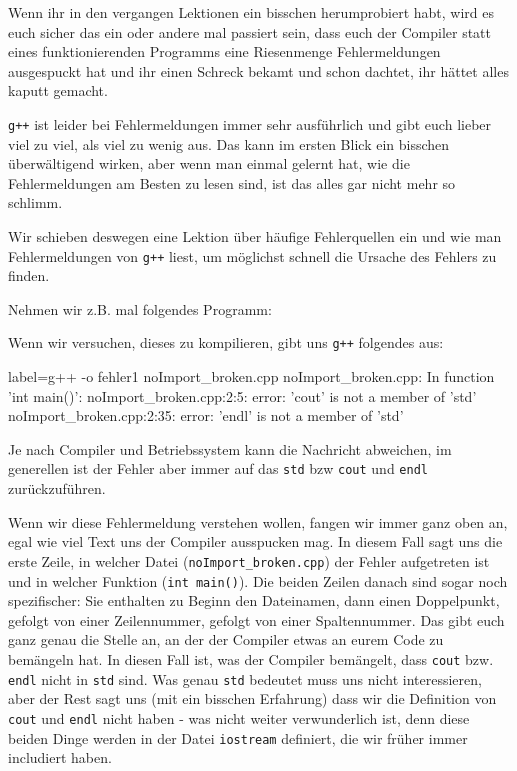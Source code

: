 
Wenn ihr in den vergangen Lektionen ein bisschen herumprobiert habt, wird es
euch sicher das ein oder andere mal passiert sein, dass euch der Compiler statt
eines funktionierenden Programms eine Riesenmenge Fehlermeldungen ausgespuckt
hat und ihr einen Schreck bekamt und schon dachtet, ihr hättet alles kaputt
gemacht.

\texttt{g++} ist leider bei Fehlermeldungen immer sehr ausführlich und gibt
euch lieber viel zu viel, als viel zu wenig aus. Das kann im ersten Blick ein
bisschen überwältigend wirken, aber wenn man einmal gelernt hat, wie die
Fehlermeldungen am Besten zu lesen sind, ist das alles gar nicht mehr so
schlimm.

Wir schieben deswegen eine Lektion über häufige Fehlerquellen ein und wie man
Fehlermeldungen von \texttt{g++} liest, um möglichst schnell die Ursache des
Fehlers zu finden.

Nehmen wir z.B. mal folgendes Programm:


Wenn wir versuchen, dieses zu kompilieren, gibt uns \texttt{g++} folgendes aus:

\begin{textcode*}{label=g++ -o fehler1 noImport\_broken.cpp}
	noImport\_broken.cpp: In function 'int main()':
	noImport\_broken.cpp:2:5: error: 'cout' is not a member of 'std'
	noImport\_broken.cpp:2:35: error: 'endl' is not a member of 'std'
\end{textcode*}

Je nach Compiler und Betriebssystem kann die Nachricht abweichen, im generellen ist der Fehler
aber immer auf das \texttt{std} bzw \texttt{cout} und \texttt{endl} zurückzuführen.

Wenn wir diese Fehlermeldung verstehen wollen, fangen wir immer ganz oben an,
egal wie viel Text uns der Compiler ausspucken mag. In diesem Fall sagt uns die
erste Zeile, in welcher Datei (\texttt{noImport\string_broken.cpp}) der Fehler aufgetreten ist
und in welcher Funktion (\texttt{int main()}). Die beiden Zeilen
danach sind sogar noch spezifischer: Sie enthalten zu Beginn den Dateinamen,
dann einen Doppelpunkt, gefolgt von einer Zeilennummer, gefolgt von einer
Spaltennummer. Das gibt euch ganz genau die Stelle an, an der der Compiler
etwas an eurem Code zu bemängeln hat. In diesen Fall ist, was der Compiler
bemängelt, dass \texttt{cout} bzw. \texttt{endl} nicht in \texttt{std} sind.
Was genau \texttt{std} bedeutet muss uns nicht interessieren, aber der Rest
sagt uns (mit ein bisschen Erfahrung) dass wir die Definition von \texttt{cout}
und \texttt{endl} nicht haben - was nicht weiter verwunderlich ist, denn diese
beiden Dinge werden in der Datei \texttt{iostream} definiert, die wir früher
immer includiert haben.

